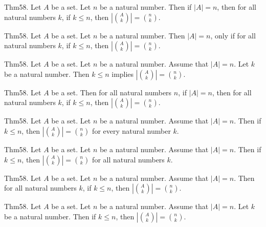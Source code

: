 \documentclass{article}
\begin{document}
Thm58. Let $A$ be a set. Let $n$ be a natural number. Then if $| A | = n$, then for all natural numbers $k$, if $k \leq n$, then $| \binom{ A }{ k}| = \binom{ n }{ k}$.

Thm58. Let $A$ be a set. Let $n$ be a natural number. Then $| A | = n$, only if for all natural numbers $k$, if $k \leq n$, then $| \binom{ A }{ k}| = \binom{ n }{ k}$.

Thm58. Let $A$ be a set. Let $n$ be a natural number. Assume that $| A | = n$. Let $k$ be a natural number. Then $k \leq n$ implies $| \binom{ A }{ k}| = \binom{ n }{ k}$.

Thm58. Let $A$ be a set. Then for all natural numbers $n$, if $| A | = n$, then for all natural numbers $k$, if $k \leq n$, then $| \binom{ A }{ k}| = \binom{ n }{ k}$.

Thm58. Let $A$ be a set. Let $n$ be a natural number. Assume that $| A | = n$. Then if $k \leq n$, then $| \binom{ A }{ k}| = \binom{ n }{ k}$ for every natural number $k$.

Thm58. Let $A$ be a set. Let $n$ be a natural number. Assume that $| A | = n$. Then if $k \leq n$, then $| \binom{ A }{ k}| = \binom{ n }{ k}$ for all natural numbers $k$.

Thm58. Let $A$ be a set. Let $n$ be a natural number. Assume that $| A | = n$. Then for all natural numbers $k$, if $k \leq n$, then $| \binom{ A }{ k}| = \binom{ n }{ k}$.

Thm58. Let $A$ be a set. Let $n$ be a natural number. Assume that $| A | = n$. Let $k$ be a natural number. Then if $k \leq n$, then $| \binom{ A }{ k}| = \binom{ n }{ k}$.
\end{document}
